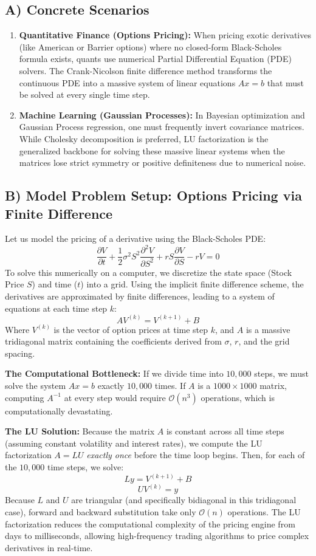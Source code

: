 \documentclass[11pt]{article}
\begin{document}
\subsection{A) Concrete Scenarios}
\begin{enumerate}
    \item \textbf{Quantitative Finance (Options Pricing):} When pricing exotic derivatives (like American or Barrier options) where no closed-form Black-Scholes formula exists, quants use numerical Partial Differential Equation (PDE) solvers. The Crank-Nicolson finite difference method transforms the continuous PDE into a massive system of linear equations $Ax = b$ that must be solved at every single time step.
    \item \textbf{Machine Learning (Gaussian Processes):} In Bayesian optimization and Gaussian Process regression, one must frequently invert covariance matrices. While Cholesky decomposition is preferred, LU factorization is the generalized backbone for solving these massive linear systems when the matrices lose strict symmetry or positive definiteness due to numerical noise.
\end{enumerate}

\subsection{B) Model Problem Setup: Options Pricing via Finite Difference}
Let us model the pricing of a derivative using the Black-Scholes PDE:
\[ \frac{\partial V}{\partial t} + \frac{1}{2}\sigma^2 S^2 \frac{\partial^2 V}{\partial S^2} + rS \frac{\partial V}{\partial S} - rV = 0 \]
To solve this numerically on a computer, we discretize the state space (Stock Price $S$) and time ($t$) into a grid. Using the implicit finite difference scheme, the derivatives are approximated by finite differences, leading to a system of equations at each time step $k$:
\[ A V^{(k)} = V^{(k+1)} + B \]
Where $V^{(k)}$ is the vector of option prices at time step $k$, and $A$ is a massive tridiagonal matrix containing the coefficients derived from $\sigma$, $r$, and the grid spacing.

\textbf{The Computational Bottleneck:}
If we divide time into $10,000$ steps, we must solve the system $A x = b$ exactly $10,000$ times. 
If $A$ is a $1000 \times 1000$ matrix, computing $A^{-1}$ at every step would require $\mathcal{O}(n^3)$ operations, which is computationally devastating.

\textbf{The LU Solution:}
Because the matrix $A$ is constant across all time steps (assuming constant volatility and interest rates), we compute the LU factorization $A = LU$ \textit{exactly once} before the time loop begins.
Then, for each of the $10,000$ time steps, we solve:
\[ L y = V^{(k+1)} + B \]
\[ U V^{(k)} = y \]
Because $L$ and $U$ are triangular (and specifically bidiagonal in this tridiagonal case), forward and backward substitution take only $\mathcal{O}(n)$ operations. The LU factorization reduces the computational complexity of the pricing engine from days to milliseconds, allowing high-frequency trading algorithms to price complex derivatives in real-time.
\end{document}
